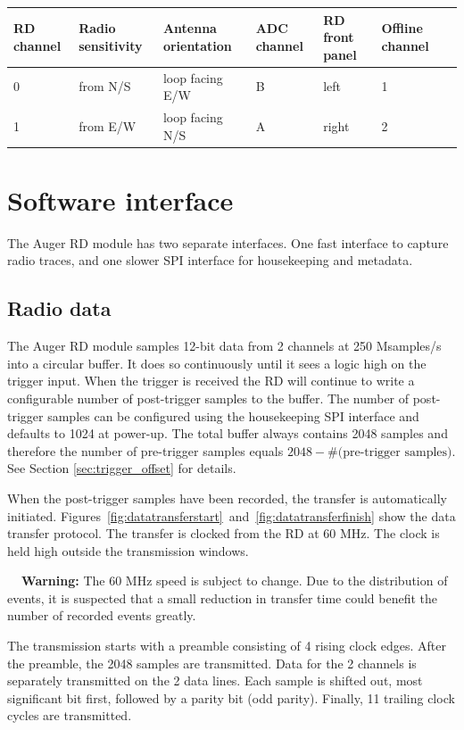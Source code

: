 \documentclass[a4paper,indent]{paper}
\newenvironment{warn}
{\par\begin{mdframed}[linewidth=2pt,linecolor=orange,backgroundcolor=orange!10]%
    \begin{list}{}{\leftmargin=0mm}\item[\bf\danger{}~~Warning: ]}
  {\end{list}\end{mdframed}\par}
\begin{document}
\begin{center}
\begin{tabular}{|l|l|l|l|l|l|l|}
  \hline
  RD channel &  Radio sensitivity & Antenna orientation & ADC channel & RD front panel & Offline channel \\
  \hline
  0 & from N/S & loop facing E/W & B & left & 1 \\
  1 & from E/W & loop facing N/S & A & right & 2 \\
  \hline
\end{tabular}
\end{center}
                                    

\section{Software interface}
The Auger \ac{RD} module has two separate interfaces.
One fast interface to capture radio traces, and one slower \ac{SPI} interface for housekeeping and metadata. 

\subsection{Radio data}
The Auger \ac{RD} module samples 12-bit data from 2 channels at 250 Msamples/s into a circular buffer.
It does so continuously until it sees a logic high on the trigger input.
When the trigger is received the \ac{RD} will continue to write a configurable number of post-trigger samples to the buffer.
The number of post-trigger samples can be configured using the housekeeping \ac{SPI} interface and defaults to 1024 at power-up.
The total buffer always contains 2048 samples and therefore the number of pre-trigger samples equals $2048-\text{\#(pre-trigger samples)}$.
See Section \ref{sec:trigger_offset} for details. 

When the post-trigger samples have been recorded, the transfer is automatically initiated.
Figures~\ref{fig:datatransferstart}~and~\ref{fig:datatransferfinish} show the data transfer protocol. 
The transfer is clocked from the RD at 60 MHz. The clock is held high outside the transmission windows.
\begin{warn}
  The 60 MHz speed is subject to change.
  Due to the distribution of events, it is suspected that a small reduction  in transfer time could benefit the number of recorded events greatly.
\end{warn}
The transmission starts with a preamble consisting of 4 rising clock edges.
After the preamble, the 2048 samples are transmitted. Data for the 2 channels is separately transmitted on the 2 data lines.
Each sample is shifted out, most significant bit first, followed by a parity bit (odd parity). Finally, 11 trailing clock cycles are transmitted.
\end{document}
